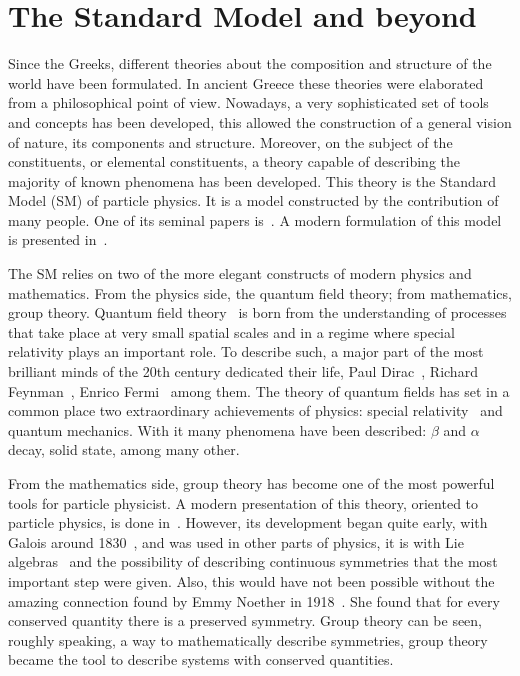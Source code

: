 \chapter[The Standard Model]{The Standard Model and beyond}
\label{chap:SM}
Since the Greeks, different theories about the composition and structure of the world have been formulated. In ancient Greece these theories were elaborated from a philosophical point of view. Nowadays, a very sophisticated set of tools and concepts has been developed, this allowed the construction of a general vision of nature, its components and structure. Moreover, on the subject of the constituents, or elemental constituents, a theory capable of describing the majority of known phenomena has been developed. This theory is the Standard Model (SM) of particle physics. It is a model constructed by the contribution of many people. One of its seminal papers is~\cite{PhysRevLett.19.1264}. A modern formulation of this model is presented in~\cite{Griffiths:2008zz}. 

The SM relies on two of the more elegant constructs of modern physics and mathematics. From the physics side, the quantum field theory; from mathematics, group theory. Quantum field theory~\cite{RevModPhys.13.203} is born from the understanding of processes that take place at very small spatial scales and in a regime where special relativity plays an important role. To describe such, a major part of the most brilliant minds of the 20th century dedicated their life, Paul Dirac~\cite{Dirac:1927dy}, Richard Feynman~\cite{Feynman:1950ir}, Enrico Fermi~\cite{Fermi:1934hr} among them. The theory of quantum fields has set in a common place two extraordinary achievements of physics: special relativity~\cite{Einstein:1905ve} and quantum mechanics. With it many phenomena have been described: $\beta$ and $\alpha$ decay, solid state, among many other.

From the mathematics side, group theory has become one of the most powerful tools for particle physicist. A modern presentation of this theory, oriented to particle physics, is done in~\cite{Georgi:1999wka}. However, its development began quite early, with Galois around 1830~\cite{Galois:2013}, and was used in other parts of physics, it is with Lie algebras~\cite{Georgi:1999wka} and the possibility of describing continuous symmetries that the most important step were given. Also, this would have not been possible without the amazing connection found by Emmy Noether in 1918~\cite{1971TTSP....1..186N}. She found that for every conserved quantity there is a preserved symmetry. Group theory can be seen, roughly speaking, a way to mathematically describe symmetries, group theory became the tool to describe systems with conserved quantities. 


